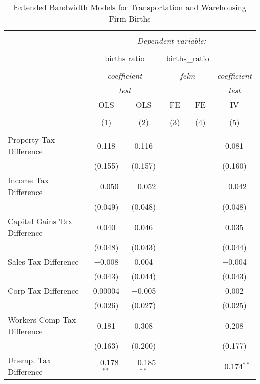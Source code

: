
\begin{table}[!htbp] \centering 
  \caption{Extended Bandwidth Models for  Transportation and Warehousing Firm Births} 
  \label{} 
\begin{tabular}{@{\extracolsep{5pt}}lccccc} 
\\[-1.8ex]\hline 
\hline \\[-1.8ex] 
 & \multicolumn{5}{c}{\textit{Dependent variable:}} \\ 
\cline{2-6} 
\\[-1.8ex] & \multicolumn{2}{c}{births ratio} & \multicolumn{2}{c}{births\_ratio} &   \\ 
\\[-1.8ex] & \multicolumn{2}{c}{\textit{coefficient}} & \multicolumn{2}{c}{\textit{felm}} & \textit{coefficient} \\ 
 & \multicolumn{2}{c}{\textit{test}} & \multicolumn{2}{c}{\textit{}} & \textit{test} \\ 
 & OLS & OLS & FE & FE & IV \\ 
\\[-1.8ex] & (1) & (2) & (3) & (4) & (5)\\ 
\hline \\[-1.8ex] 
 Property Tax Difference & 0.118 & 0.116 &  &  & 0.081 \\ 
  & (0.155) & (0.157) &  &  & (0.160) \\ 
  Income Tax Difference & $-$0.050 & $-$0.052 &  &  & $-$0.042 \\ 
  & (0.049) & (0.048) &  &  & (0.048) \\ 
  Capital Gains Tax Difference & 0.040 & 0.046 &  &  & 0.035 \\ 
  & (0.048) & (0.043) &  &  & (0.044) \\ 
  Sales Tax Difference & $-$0.008 & 0.004 &  &  & $-$0.004 \\ 
  & (0.043) & (0.044) &  &  & (0.043) \\ 
  Corp Tax Difference & 0.00004 & $-$0.005 &  &  & 0.002 \\ 
  & (0.026) & (0.027) &  &  & (0.025) \\ 
  Workers Comp Tax Difference & 0.181 & 0.308 &  &  & 0.208 \\ 
  & (0.163) & (0.200) &  &  & (0.177) \\ 
  Unemp. Tax Difference & $-$0.178$^{**}$ & $-$0.185$^{**}$ &  &  & $-$0.174$^{**}$ \\ 

\end{tabular}
\end{table}
